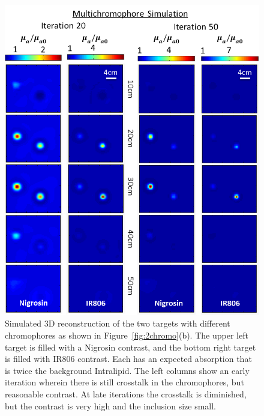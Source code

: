 \begin{figure}[p]
\begin{center}
\includegraphics[width=14.5cm]{./figures/4_Gen3/3DsimMC.png}
\caption[Simulated 3D reconstruction of the two targets with different chromophores as shown in Figure~\ref{fig:2chromo}(b)]{Simulated 3D reconstruction of the two targets with different chromophores as shown in Figure~\ref{fig:2chromo}(b). The upper left target is filled with a Nigrosin contrast, and the bottom right target is filled with IR806 contrast. Each has an expected absorption that is twice the background Intralipid. The left columns show an early iteration wherein there is still crosstalk in the chromophores, but reasonable contrast. At late iterations the crosstalk is diminished, but the contrast is very high and the inclusion size small.}
\label{fig:3DsimMC}
\end{center}
\end{figure}

